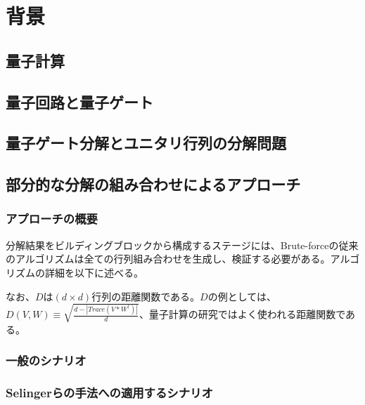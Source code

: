 \chapter{背景}\label{chap:background}
\section{量子計算}\label{sec:quantum_computing}
\section{量子回路と量子ゲート}\label{sec:quantum_circuit}
\section{量子ゲート分解とユニタリ行列の分解問題}\label{sec:quantum_circuit}
\section{部分的な分解の組み合わせによるアプローチ}\label{sec:related_works}
\subsection{アプローチの概要}
分解結果をビルディングブロックから構成するステージには、Brute-forceの従来のアルゴリズムは全ての行列組み合わせを生成し、検証する必要がある。アルゴリズムの詳細を以下に述べる。

なお、$D$は$(d \times d)$行列の距離関数である。$D$の例としては、$D(V, W) \equiv \sqrt{\frac{d - |Trace(V*W^{\dagger})|}{d}}$、量子計算の研究ではよく使われる距離関数である。

\subsection{一般のシナリオ}
\subsection{Selingerらの手法への適用するシナリオ}